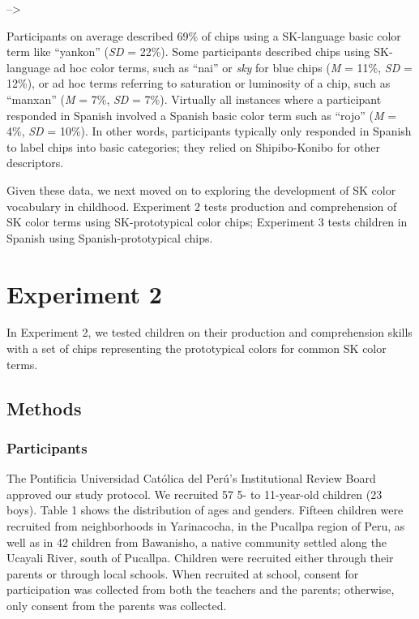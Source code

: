 \documentclass[,man,floatsintext]{apa6}
\theoremstyle{definition}
\theoremstyle{definition}
\theoremstyle{definition}
\theoremstyle{remark}
\begin{document}
\hypertarget{htmlwidget-eaef49d4a484bc22a8b4}{}

--\textgreater{}

Participants on average described 69\% of chips using a SK-language
basic color term like \enquote{yankon} (\emph{SD} = 22\%). Some
participants described chips using SK-language ad hoc color terms, such
as \enquote{nai} or \emph{sky} for blue chips (\emph{M} = 11\%,
\emph{SD} = 12\%), or ad hoc terms referring to saturation or luminosity
of a chip, such as \enquote{manxan} (\emph{M} = 7\%, \emph{SD} = 7\%).
Virtually all instances where a participant responded in Spanish
involved a Spanish basic color term such as \enquote{rojo} (\emph{M} =
4\%, \emph{SD} = 10\%). In other words, participants typically only
responded in Spanish to label chips into basic categories; they relied
on Shipibo-Konibo for other descriptors.

Given these data, we next moved on to exploring the development of SK
color vocabulary in childhood. Experiment 2 tests production and
comprehension of SK color terms using SK-prototypical color chips;
Experiment 3 tests children in Spanish using Spanish-prototypical chips.

\section{Experiment 2}\label{experiment-2}

In Experiment 2, we tested children on their production and
comprehension skills with a set of chips representing the prototypical
colors for common SK color terms.

\subsection{Methods}\label{methods-1}

\subsubsection{Participants}\label{participants-1}

The Pontificia Universidad Católica del Perú's Institutional Review
Board approved our study protocol. We recruited 57 5- to 11-year-old
children (23 boys). Table 1 shows the distribution of ages and genders.
Fifteen children were recruited from neighborhoods in Yarinacocha, in
the Pucallpa region of Peru, as well as in 42 children from Bawanisho, a
native community settled along the Ucayali River, south of Pucallpa.
Children were recruited either through their parents or through local
schools. When recruited at school, consent for participation was
collected from both the teachers and the parents; otherwise, only
consent from the parents was collected.
\end{document}
